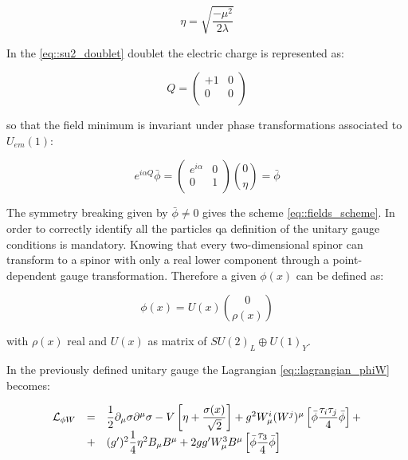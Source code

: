 \begin{equation}
\eta = \sqrt{\dfrac{-\mu^{2}}{2\lambda}}
\label{eq::eta_value}
\end{equation}

In the \ref{eq::su2_doublet} doublet the electric charge is represented as:

\begin{equation}
Q = 
\begin{pmatrix}
+1 & 0 \\
0 & 0 \\
\end{pmatrix}
\end{equation}

so that the field minimum is invariant under phase transformations associated to $U_{em}(1)$:

\begin{equation}
e^{i\alpha Q} \bar{\phi} = 
\begin{pmatrix}
e^{i\alpha} & 0 \\
0 & 1 \\ 
\end{pmatrix}
\binom{0}{\eta}
= \bar{\phi}
\end{equation}

The symmetry breaking given by $\bar{\phi} \neq 0$ gives the scheme \ref{eq::fields_scheme}.
In order to correctly identify all the particles qa definition of the unitary gauge conditions is mandatory. Knowing that every two-dimensional spinor can transform to a spinor with only a real lower component through a point-dependent gauge transformation. Therefore a given $\phi(x)$
can be defined as:

\begin{equation}
\phi(x) = U(x) \binom{0}{\rho(x)}
\end{equation}

with $\rho(x)$ real and $U(x)$ as matrix of $ SU(2)_{L} \oplus U(1)_{Y}$. 

In the previously defined unitary gauge the Lagrangian \ref{eq::lagrangian_phiW} becomes:

\begin{equation}
\begin{array}{r c l}
\mathcal{L}_{\phi W}&=&\dfrac{1}{2} \partial_{\mu} \sigma \partial^{\mu} \sigma - V \left[ \eta + \dfrac{\sigma(x)}{\sqrt{2}}\right] + g^{2} W_{\mu}^{i}(W^{j})^{\mu} \left[ \bar{\phi} \dfrac{\tau_{i}\tau_{j}}{4}\bar{\phi}\right] +\\
&+&(g^{\prime})^{2} \dfrac{1}{4}\eta^{2} B_{\mu} B^{\mu} + 2 gg^{\prime} W^{3}_{\mu} B^{\mu} \left[ \bar{\phi} \dfrac{\tau_{3}}{4} \bar{\phi} \right]
\end{array}
\end{equation}

